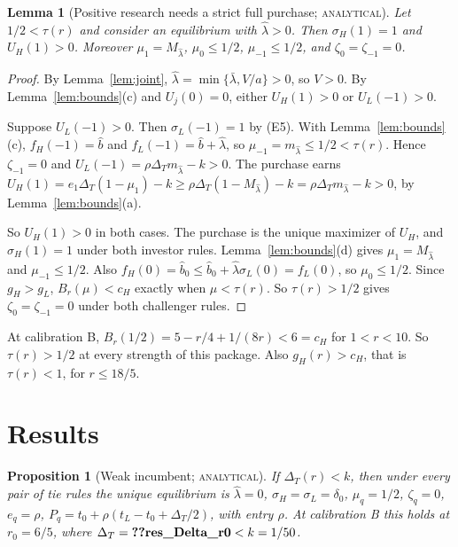 \documentclass[12pt]{article}
\newtheorem{proposition}{Proposition}
\newtheorem{lemma}{Lemma}
\theoremstyle{definition}
\theoremstyle{remark}
\newcommand{\DT}{\Delta_T}
\newcommand{\lh}{\hat\lambda}
\newcommand{\lb}{\bar\lambda}
\newcommand{\st}[1]{\textsc{#1}}
\begin{document}
\begin{lemma}[Positive research needs a strict full purchase; \st{analytical}]\label{lem:buy}
Let $1/2<\tau(r)$ and consider an equilibrium with $\lh>0$. Then $\sigma_H(1)=1$ and $U_H(1)>0$. Moreover
$\mu_1=M_{\lh}$, $\mu_0\le1/2$, $\mu_{-1}\le1/2$, and $\zeta_0=\zeta_{-1}=0$.
\end{lemma}

\begin{proof}
By Lemma~\ref{lem:joint}, $\lh=\min\{\lb,V/a\}>0$, so $V>0$. By Lemma~\ref{lem:bounds}(c) and $U_j(0)=0$, either
$U_H(1)>0$ or $U_L(-1)>0$.

Suppose $U_L(-1)>0$. Then $\sigma_L(-1)=1$ by (E5). With Lemma~\ref{lem:bounds}(c), $f_H(-1)=\hat b$ and
$f_L(-1)=\hat b+\lh$, so $\mu_{-1}=m_{\lh}\le1/2<\tau(r)$. Hence $\zeta_{-1}=0$ and
$U_L(-1)=\rho\DT m_{\lh}-k>0$. The purchase earns
$U_H(1)=e_1\DT(1-\mu_1)-k\ge\rho\DT(1-M_{\lh})-k=\rho\DT m_{\lh}-k>0$, by Lemma~\ref{lem:bounds}(a).

So $U_H(1)>0$ in both cases. The purchase is the unique maximizer of $U_H$, and $\sigma_H(1)=1$ under both investor
rules. Lemma~\ref{lem:bounds}(d) gives $\mu_1=M_{\lh}$ and $\mu_{-1}\le1/2$. Also $f_H(0)=\hat b_0\le\hat b_0+\lh\sigma_L(0)
=f_L(0)$, so $\mu_0\le1/2$. Since $g_H>g_L$, $B_r(\mu)<c_H$ exactly when $\mu<\tau(r)$. So $\tau(r)>1/2$ gives
$\zeta_0=\zeta_{-1}=0$ under both challenger rules.
\end{proof}

At calibration B, $B_r(1/2)=5-r/4+1/(8r)<6=c_H$ for $1<r<10$. So $\tau(r)>1/2$ at every strength of this
package. Also $g_H(r)>c_H$, that is $\tau(r)<1$, for $r\le 18/5$.

\section{Results}\label{sec:results}

\begin{proposition}[Weak incumbent; \st{analytical}]\label{prop:weak}
If $\DT(r)<k$, then under every pair of tie rules the unique equilibrium is
$\lh=0$, $\sigma_H=\sigma_L=\delta_0$, $\mu_q=1/2$, $\zeta_q=0$, $e_q=\rho$, $P_q=t_0+\rho(t_L-t_0+\DT/2)$, with
entry $\rho$. At calibration B this holds at $r_0=6/5$, where $\DT=\reg{res_Delta_r0}<k=1/50$.
\end{proposition}
\end{document}
